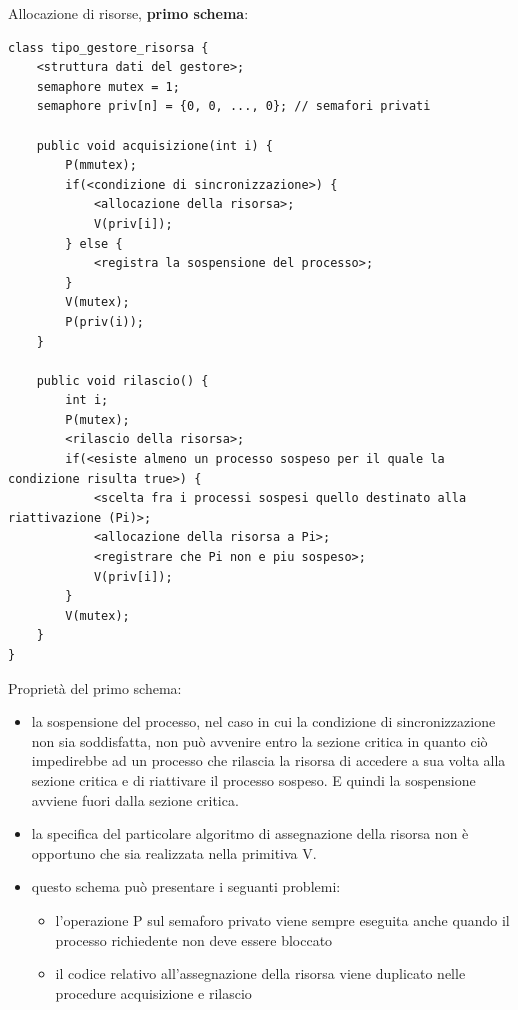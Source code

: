 \documentclass{article}
\begin{document}
\vspace{3mm}
Allocazione di risorse, \textbf{primo schema}:

\begin{lstlisting}
class tipo_gestore_risorsa {
    <struttura dati del gestore>;
    semaphore mutex = 1;
    semaphore priv[n] = {0, 0, ..., 0}; // semafori privati

    public void acquisizione(int i) {
        P(mmutex);
        if(<condizione di sincronizzazione>) {
            <allocazione della risorsa>;
            V(priv[i]);
        } else {
            <registra la sospensione del processo>;
        }
        V(mutex);
        P(priv(i));
    }

    public void rilascio() {
        int i;
        P(mutex);
        <rilascio della risorsa>;
        if(<esiste almeno un processo sospeso per il quale la condizione risulta true>) {
            <scelta fra i processi sospesi quello destinato alla riattivazione (Pi)>;
            <allocazione della risorsa a Pi>;
            <registrare che Pi non e piu sospeso>;
            V(priv[i]);
        }
        V(mutex);
    }
}
\end{lstlisting}

\vspace{3mm}
Proprietà del primo schema:
\begin{itemize}
    \item la sospensione del processo, nel caso in cui la condizione di sincronizzazione non sia soddisfatta, non può avvenire entro la sezione critica in quanto 
    ciò impedirebbe ad un processo che rilascia la risorsa di accedere a sua volta alla sezione critica e di riattivare il processo sospeso. E quindi la sospensione
    avviene fuori dalla sezione critica.
    \item la specifica del particolare algoritmo di assegnazione della risorsa non è opportuno che sia realizzata nella primitiva V.
    \item questo schema può presentare i seguanti problemi:
    \begin{itemize}
        \item l'operazione P sul semaforo privato viene sempre eseguita anche quando il processo richiedente non deve essere bloccato
        \item il codice relativo all'assegnazione della risorsa viene duplicato nelle procedure acquisizione e rilascio
    \end{itemize}
\end{itemize}
\end{document}
